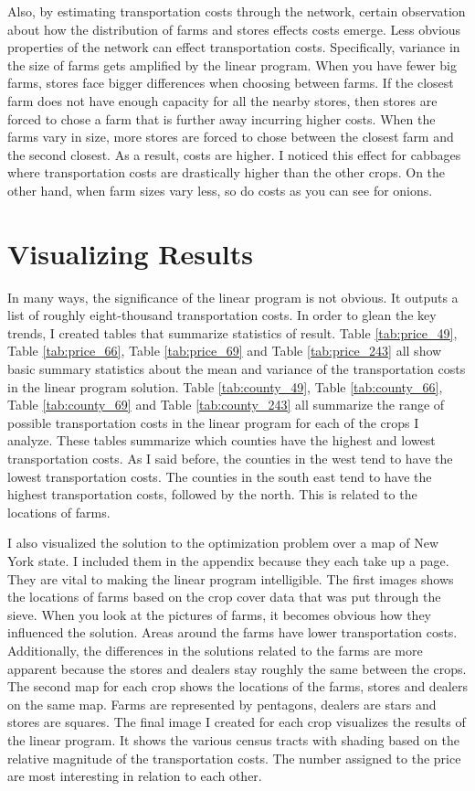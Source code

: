 \documentclass{report}
\begin{document}
Also, by estimating transportation costs through the network, certain observation about how the distribution of farms and stores effects costs emerge. Less obvious properties of the network can effect transportation costs. Specifically, variance in the size of farms gets amplified by the linear program. When you have fewer big farms, stores face bigger differences when choosing between farms. If the closest farm does not have enough capacity for all the nearby stores, then stores are forced to chose a farm that is further away incurring higher costs. When the farms vary in size, more stores are forced to chose between the closest farm and the second closest. As a result, costs are higher. I noticed this effect for cabbages where transportation costs are drastically higher than the other crops. On the other hand, when farm sizes vary less, so do costs as you can see for onions.

\section{Visualizing Results}

In many ways, the significance of the linear program is not obvious. It outputs a list of roughly eight-thousand transportation costs. In order to glean the key trends, I created tables that summarize statistics of result. Table  \ref{tab:price_49}, Table  \ref{tab:price_66}, Table  \ref{tab:price_69} and Table  \ref{tab:price_243} all show basic summary statistics about the mean and variance of the transportation costs in the linear program solution. Table \ref{tab:county_49}, Table \ref{tab:county_66}, Table \ref{tab:county_69} and Table \ref{tab:county_243} all summarize the range of possible transportation costs in the linear program for each of the crops I analyze. These tables summarize which counties have the highest and lowest transportation costs. As I said before, the counties in the west tend to have the lowest transportation costs. The counties in the south east tend to have the highest transportation costs, followed by the north. This is related to the locations of farms.

I also visualized the solution to the optimization problem over a map of New York state. I included them in the appendix because they each take up a page. They are vital to making the linear program intelligible. The first images shows the locations of farms based on the crop cover data that was put through the sieve. When you look at the pictures of farms, it becomes obvious how they influenced the solution. Areas around the farms have lower transportation costs. Additionally, the differences in the solutions related to the farms are more apparent because the stores and dealers stay roughly the same between the crops. The second map for each crop shows the locations of the farms, stores and dealers on the same map. Farms are represented by pentagons, dealers are stars and stores are squares. The final image I created for each crop visualizes the results of the linear program. It shows the various census tracts with shading based on the relative magnitude of the transportation costs. The number assigned to the price are most interesting in relation to each other.
\end{document}
